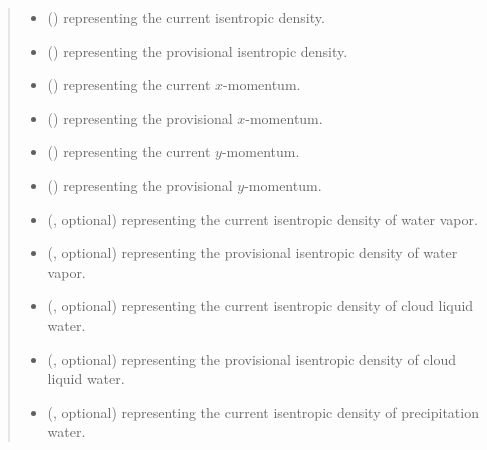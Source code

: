\documentclass[letterpaper,10pt,english]{sphinxmanual}
\begin{document}
\begin{fulllineitems}
\begin{fulllineitems}
\begin{quote}
\begin{description}
\begin{itemize}
\item {} 
 () \textendash{}  representing the current isentropic density.

\item {} 
 () \textendash{}  representing the provisional isentropic density.

\item {} 
 () \textendash{}  representing the current \(x\)-momentum.

\item {} 
 () \textendash{}  representing the provisional \(x\)-momentum.

\item {} 
 () \textendash{}  representing the current \(y\)-momentum.

\item {} 
 () \textendash{}  representing the provisional \(y\)-momentum.

\item {} 
 (, optional) \textendash{}  representing the current isentropic density of water vapor.

\item {} 
 (, optional) \textendash{}  representing the provisional isentropic density of water vapor.

\item {} 
 (, optional) \textendash{}  representing the current isentropic density of cloud liquid water.

\item {} 
 (, optional) \textendash{}  representing the provisional isentropic density of cloud liquid water.

\item {} 
 (, optional) \textendash{}  representing the current isentropic density of precipitation water.


\end{itemize}
\end{description}
\end{quote}
\end{fulllineitems}
\end{fulllineitems}
\end{document}
